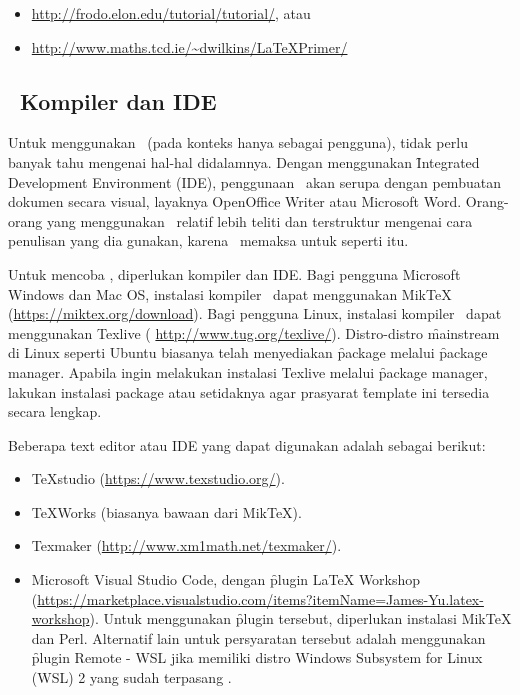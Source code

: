 \begin{itemize}
	\item \url{http://frodo.elon.edu/tutorial/tutorial/}, atau
	\item \url{http://www.maths.tcd.ie/~dwilkins/LaTeXPrimer/}
\end{itemize}

\subsection{\latex~Kompiler dan IDE}
\label{sec:latexCompiler}
Untuk menggunakan \latex~(pada konteks hanya sebagai pengguna), tidak perlu banyak tahu mengenai hal-hal didalamnya.
Dengan menggunakan \f{Integrated Development Environment} (IDE), penggunaan \latex~akan serupa dengan pembuatan dokumen secara visual, layaknya OpenOffice Writer atau Microsoft Word.
Orang-orang yang menggunakan \latex~relatif lebih teliti dan terstruktur mengenai cara penulisan yang dia gunakan, karena \latex~memaksa untuk seperti itu.

Untuk mencoba \latex, diperlukan kompiler dan IDE.
Bagi pengguna Microsoft Windows dan Mac OS, instalasi kompiler \latex~dapat menggunakan MikTeX (\url{https://miktex.org/download}).
Bagi pengguna Linux, instalasi kompiler \latex~dapat menggunakan Texlive ( \url{http://www.tug.org/texlive/}).
Distro-distro \f{mainstream} di Linux seperti Ubuntu biasanya telah menyediakan \f{package}  melalui \f{package manager}.
Apabila ingin melakukan instalasi Texlive melalui \f{package manager}, lakukan instalasi package  atau setidaknya  agar prasyarat \f{template} ini tersedia secara lengkap.

Beberapa text editor atau IDE yang dapat digunakan adalah sebagai berikut:
\begin{itemize}
	\item TeXstudio (\url{https://www.texstudio.org/}).
	\item TeXWorks (biasanya bawaan dari MikTeX).
	\item Texmaker (\url{http://www.xm1math.net/texmaker/}).
	\item Microsoft Visual Studio Code, dengan \f{plugin} LaTeX Workshop (\url{https://marketplace.visualstudio.com/items?itemName=James-Yu.latex-workshop}).
	Untuk menggunakan \f{plugin} tersebut, diperlukan instalasi MikTeX dan Perl.
	Alternatif lain untuk persyaratan tersebut adalah menggunakan \f{plugin} Remote - WSL jika memiliki distro Windows Subsystem for Linux (WSL) 2 yang sudah terpasang .
\end{itemize}


